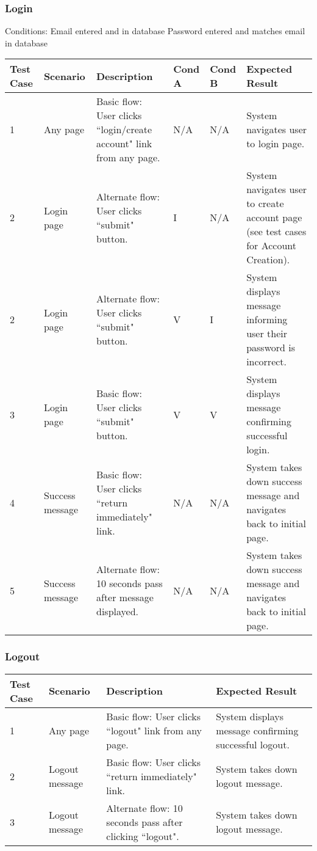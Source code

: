 \begin{landscape}
\subsubsection{Login}
\begin{outline}[enumerate]
\1 [] Conditions:
\2 [A] Email entered and in database
\2 [B] Password entered and matches email in database
\end{outline}
\begin{table}[!h]
    \begin{tabular}{|l|p{1in}|p{2.25in}|l|l|p{2.25in}|}
        \hline
        Test Case & Scenario & Description & Cond A & Cond B & Expected Result \\ \hline
        1 & Any page & Basic flow: User clicks ``login/create account" link from any page. & N/A & N/A & System navigates user to login page. \\ \hline
        2 & Login page & Alternate flow: User clicks ``submit" button. & I & N/A & System navigates user to create account page (see test cases for Account Creation). \\ \hline
        2 & Login page & Alternate flow: User clicks ``submit" button. & V & I & System displays message informing user their password is incorrect. \\ \hline
        3 & Login page & Basic flow: User clicks ``submit" button. & V & V & System displays message confirming successful login. \\ \hline
        4 & Success message & Basic flow: User clicks ``return immediately" link. & N/A & N/A & System takes down success message and navigates back to initial page. \\ \hline
        5 & Success message & Alternate flow: 10 seconds pass after message displayed. & N/A & N/A & System takes down success message and navigates back to initial page. \\ \hline
    \end{tabular}
\end{table}

\subsubsection{Logout}
\begin{table}[!h]
    \begin{tabular}{|l|p{1in}|p{2.25in}|p{2.25in}|}
        \hline
        Test Case & Scenario & Description & Expected Result \\ \hline
        1 & Any page & Basic flow: User clicks ``logout" link from any page. & System displays message confirming successful logout. \\ \hline
        2 & Logout message & Basic flow: User clicks ``return immediately" link. & System takes down logout message. \\ \hline
        3 & Logout message & Alternate flow: 10 seconds pass after clicking ``logout". & System takes down logout message. \\ \hline
    \end{tabular}
\end{table}


\end{landscape}
